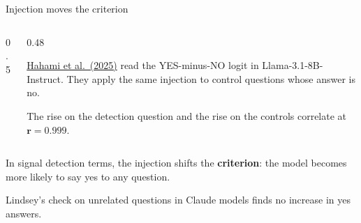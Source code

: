 \documentclass[aspectratio=169,11pt]{beamer}
\newcommand{\site}{https://measuring-self-reports.github.io/measuring-self-reports}
\begin{document}
\begin{frame}[label=hahami]{Injection moves the criterion}
\begin{columns}[T]
\begin{column}{0.5\textwidth}
\end{column}
\begin{column}{0.48\textwidth}
{\small \href{\site/papers/hahami-2025/}{Hahami et al.\ (2025)} read the YES-minus-NO logit in Llama-3.1-8B-Instruct. They apply the same injection to control questions whose answer is no.

\vspace{0.4em}
The rise on the detection question and the rise on the controls correlate at $\mathbf{r = 0.999}$.}
\end{column}
\end{columns}

\vspace{0.5em}
In signal detection terms, the injection shifts the \textbf{\textcolor{bias}{criterion}}: the model becomes more likely to say yes to any question.

\vspace{0.3em}
{\small Lindsey's check on unrelated questions in Claude models finds no increase in yes answers.}
\end{frame}
\end{document}
